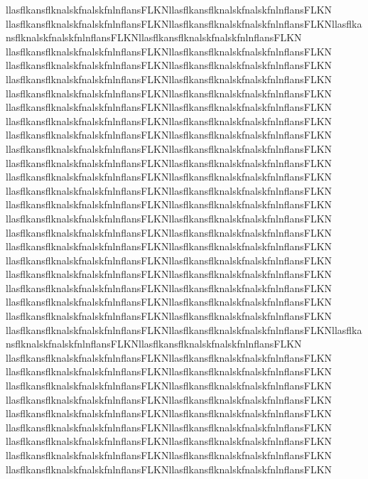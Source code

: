 \documentclass[final]{beamer}
\begin{document}
\begin{minipage}{0.5\textwidth}
    llasflkansflknalskfnalskfnlnflansFLKNllasflkansflknalskfnalskfnlnflansFLKN    llasflkansflknalskfnalskfnlnflansFLKNllasflkansflknalskfnalskfnlnflansFLKNllasflkansflknalskfnalskfnlnflansFLKNllasflkansflknalskfnalskfnlnflansFLKN    llasflkansflknalskfnalskfnlnflansFLKNllasflkansflknalskfnalskfnlnflansFLKN
    llasflkansflknalskfnalskfnlnflansFLKNllasflkansflknalskfnalskfnlnflansFLKN
    llasflkansflknalskfnalskfnlnflansFLKNllasflkansflknalskfnalskfnlnflansFLKN    llasflkansflknalskfnalskfnlnflansFLKNllasflkansflknalskfnalskfnlnflansFLKN
    llasflkansflknalskfnalskfnlnflansFLKNllasflkansflknalskfnalskfnlnflansFLKN
    llasflkansflknalskfnalskfnlnflansFLKNllasflkansflknalskfnalskfnlnflansFLKN
    llasflkansflknalskfnalskfnlnflansFLKNllasflkansflknalskfnalskfnlnflansFLKN
    llasflkansflknalskfnalskfnlnflansFLKNllasflkansflknalskfnalskfnlnflansFLKN
    llasflkansflknalskfnalskfnlnflansFLKNllasflkansflknalskfnalskfnlnflansFLKN
    llasflkansflknalskfnalskfnlnflansFLKNllasflkansflknalskfnalskfnlnflansFLKN
    llasflkansflknalskfnalskfnlnflansFLKNllasflkansflknalskfnalskfnlnflansFLKN
    llasflkansflknalskfnalskfnlnflansFLKNllasflkansflknalskfnalskfnlnflansFLKN
    llasflkansflknalskfnalskfnlnflansFLKNllasflkansflknalskfnalskfnlnflansFLKN
    llasflkansflknalskfnalskfnlnflansFLKNllasflkansflknalskfnalskfnlnflansFLKN
    llasflkansflknalskfnalskfnlnflansFLKNllasflkansflknalskfnalskfnlnflansFLKN
    llasflkansflknalskfnalskfnlnflansFLKNllasflkansflknalskfnalskfnlnflansFLKN
    llasflkansflknalskfnalskfnlnflansFLKNllasflkansflknalskfnalskfnlnflansFLKN
    llasflkansflknalskfnalskfnlnflansFLKNllasflkansflknalskfnalskfnlnflansFLKN
    llasflkansflknalskfnalskfnlnflansFLKNllasflkansflknalskfnalskfnlnflansFLKN
    llasflkansflknalskfnalskfnlnflansFLKNllasflkansflknalskfnalskfnlnflansFLKN    llasflkansflknalskfnalskfnlnflansFLKNllasflkansflknalskfnalskfnlnflansFLKNllasflkansflknalskfnalskfnlnflansFLKNllasflkansflknalskfnalskfnlnflansFLKN    llasflkansflknalskfnalskfnlnflansFLKNllasflkansflknalskfnalskfnlnflansFLKN
    llasflkansflknalskfnalskfnlnflansFLKNllasflkansflknalskfnalskfnlnflansFLKN
    llasflkansflknalskfnalskfnlnflansFLKNllasflkansflknalskfnalskfnlnflansFLKN    llasflkansflknalskfnalskfnlnflansFLKNllasflkansflknalskfnalskfnlnflansFLKN
    llasflkansflknalskfnalskfnlnflansFLKNllasflkansflknalskfnalskfnlnflansFLKN
    llasflkansflknalskfnalskfnlnflansFLKNllasflkansflknalskfnalskfnlnflansFLKN
    llasflkansflknalskfnalskfnlnflansFLKNllasflkansflknalskfnalskfnlnflansFLKN
    llasflkansflknalskfnalskfnlnflansFLKNllasflkansflknalskfnalskfnlnflansFLKN
    llasflkansflknalskfnalskfnlnflansFLKNllasflkansflknalskfnalskfnlnflansFLKN

\end{minipage}
\end{document}
